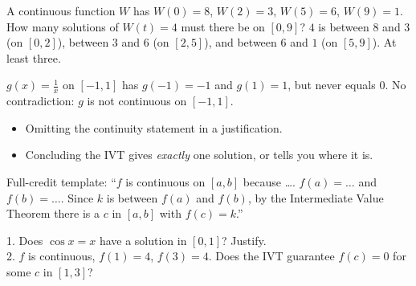 \begin{example}
A continuous function $W$ has $W(0)=8$, $W(2)=3$, $W(5)=6$, $W(9)=1$. How many solutions of $W(t)=4$ must there be on $[0,9]$?
\sol $4$ is between $8$ and $3$ (on $[0,2]$), between $3$ and $6$ (on $[2,5]$), and between $6$ and $1$ (on $[5,9]$). At least three.
\end{example}

\begin{example}
$g(x)=\frac1x$ on $[-1,1]$ has $g(-1)=-1$ and $g(1)=1$, but never equals $0$. No contradiction: $g$ is not continuous on $[-1,1]$.
\end{example}

\begin{mistakes}
\begin{itemize}
\item Omitting the continuity statement in a justification.
\item Concluding the IVT gives \emph{exactly} one solution, or tells you where it is.
\end{itemize}
\end{mistakes}

\begin{aptip}
Full-credit template: ``$f$ is continuous on $[a,b]$ because \dots. $f(a)=\dots$ and $f(b)=\dots$. Since $k$ is between $f(a)$ and $f(b)$, by the Intermediate Value Theorem there is a $c$ in $[a,b]$ with $f(c)=k$.''
\end{aptip}

\begin{quickcheck}
1. Does $\cos x=x$ have a solution in $[0,1]$? Justify.\\
2. $f$ is continuous, $f(1)=4$, $f(3)=4$. Does the IVT guarantee $f(c)=0$ for some $c$ in $[1,3]$?
\end{quickcheck}
